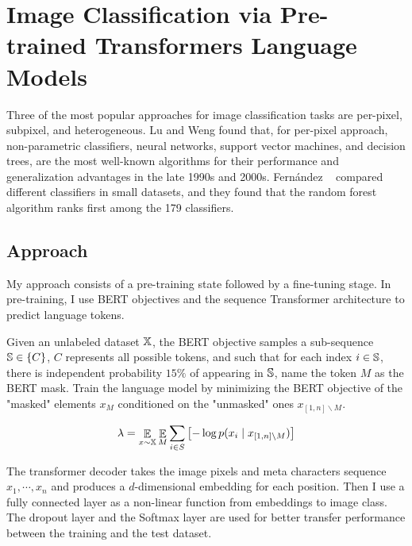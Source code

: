 \documentclass[review]{cvpr}
\begin{document}
\section{Image Classification via Pre-trained Transformers Language Models}

Three of the most popular approaches for image classification tasks are per-pixel, subpixel, and heterogeneous.
Lu and Weng found that, for per-pixel approach, non-parametric classifiers, \eg neural networks, support vector machines, and decision trees,
are the most well-known algorithms for their performance and generalization advantages in the late 1990s and 2000s.
Fern{\'a}ndez \etal~\cite{fernandez2014we} compared different classifiers in small datasets, and they found that the random forest algorithm ranks first among the 179 classifiers.

\subsection{Approach}

My approach consists of a pre-training state followed by a fine-tuning stage.
In pre-training, I use BERT objectives and the sequence Transformer architecture to predict language tokens.

\par Given an unlabeled dataset $\Bbb X$, the BERT objective samples a sub-sequence $\Bbb S \in \{C\}$,
$C$ represents all possible tokens, and such that for each index $i \in \Bbb S$,
there is independent probability $15\%$ of appearing in $\Bbb S$,
name the token $M$ as the BERT mask.
Train the language model by minimizing the BERT objective of the "masked" elements $x_M$
conditioned on the "unmasked" ones $x_{\left[1,n\right]\backslash M}$.

\begin{equation}
  \lambda = \mathop{\Bbb E}\limits_{x\sim\Bbb X} \mathop{\Bbb E}\limits_{M} \sum_{i\in S}{\bigl[-\log{p(x_i\mid x_{\left[1,n \right]\backslash M})\bigr]}}
\end{equation}

\par The transformer decoder takes the image pixels and meta characters sequence $x_1,\cdots,x_n$ and produces a $d$-dimensional
embedding for each position.
Then I use a fully connected layer as a non-linear function from embeddings to image class.
The dropout layer and the Softmax layer are used for better transfer performance between the training and the test dataset.
\end{document}
